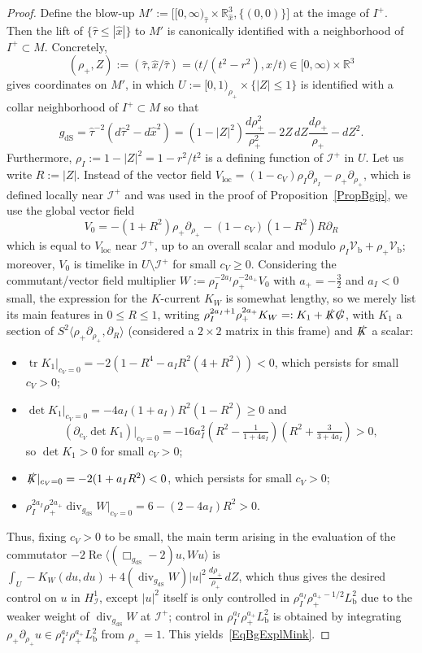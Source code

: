 \documentclass[reqno,11pt,letterpaper]{amsart}
\numberwithin{equation}{section}
\numberwithin{figure}{section}
\theoremstyle{definition}
\theoremstyle{remark}
\newcommand{\ms}{\mathscr}
\newcommand{\scri}{\ms I}
\newcommand{\R}{\mathbb{R}}
\newcommand{\slG}{\slashed{G}{}}
\newcommand{\slK}{\slashed{K}{}}
\renewcommand{\Re}{\operatorname{Re}}
\newcommand{\tr}{\operatorname{tr}}
\newcommand{\dv}{\operatorname{div}}
\newcommand{\dS}{{\mathrm{dS}}}
\newcommand{\la}{\langle}
\newcommand{\pa}{\partial}
\newcommand{\ra}{\rangle}
\newcommand{\bop}{{\mathrm{b}}}
\newcommand{\Vf}{\mathcal V}
\newcommand{\Vb}{\Vf_\bop}
\newcommand{\loc}{{\mathrm{loc}}}
\newcommand{\Hscri}{H_{\scri}}
\begin{document}
\begin{proof}
  Define the blow-up $M':=\bigl[[0,\infty)_{\hat\tau}\times\R^3_{\hat x},\{(0,0)\}\bigr]$ at the image of $I^+$. Then the lift of $\{\hat\tau\leq |\hat x|\}$ to $M'$ is canonically identified with a neighborhood of $I^+\subset M$. Concretely,
  \[
    (\rho_+,Z):=(\hat\tau,\hat x/\hat\tau)=\bigl(t/(t^2-r^2),x/t\bigr) \in [0,\infty)\times\R^3
  \]
  gives coordinates on $M'$, in which $U:=[0,1)_{\rho_+}\times\{|Z|\leq 1\}$ is identified with a collar neighborhood of $I^+\subset M$ so that
  \begin{equation}
  \label{EqBgExplStaticdS}
    g_\dS=\hat\tau^{-2}(d\hat\tau^2-d\hat x^2) = (1-|Z|^2)\frac{d\rho_+^2}{\rho_+^2} - 2 Z\,dZ\frac{d\rho_+}{\rho_+} - dZ^2.
  \end{equation}
  Furthermore, $\rho_I:=1-|Z|^2=1-r^2/t^2$ is a defining function of $\scri^+$ in $U$. Let us write $R:=|Z|$. Instead of the vector field $V_\loc=(1-c_V)\rho_I\pa_{\rho_I}-\rho_+\pa_{\rho_+}$, which is defined locally near $\scri^+$ and was used in the proof of Proposition~\ref{PropBgip}, we use the global vector field
  \[
    V_0 = -(1+R^2)\rho_+\pa_{\rho_+} - (1-c_V)(1-R^2)R\pa_R
  \]
  which is equal to $V_\loc$ near $\scri^+$, up to an overall scalar and modulo $\rho_I\Vb+\rho_+\Vb$; moreover, $V_0$ is timelike in $U\setminus\scri^+$ for small $c_V\geq 0$. Considering the commutant/vector field multiplier $W:=\rho_I^{-2 a_I}\rho_+^{-2 a_+}V_0$ with $a_+=-\tfrac32$ and $a_I<0$ small, the expression for the $K$-current $K_W$ is somewhat lengthy, so we merely list its main features in $0\leq R\leq 1$, writing $\rho_I^{2 a_I+1}\rho_+^{2 a_+}K_W=:K_1+\slK\slG$, with $K_1$ a section of $S^2\la \rho_+\pa_{\rho_+},\pa_R\ra$ (considered a $2\times 2$ matrix in this frame) and $\slK$ a scalar:
  \begin{itemize}
  \item $\tr K_1|_{c_V=0}=-2(1-R^4-a_I R^2(4+R^2))<0$, which persists for small $c_V>0$;
  \item $\det K_1|_{c_V=0}=-4 a_I(1+a_I)R^2(1-R^2)\geq 0$ and
    \[
      (\pa_{c_V}\det K_1)|_{c_V=0} = -16 a_I^2(R^2-\tfrac{1}{1+4 a_I})(R^2+\tfrac{3}{3+4 a_I}) > 0,
    \]
    so $\det K_1>0$ for small $c_V>0$;
  \item $\slK|_{c_V=0}=-2(1+a_I R^2)<0$, which persists for small $c_V>0$;
  \item $\rho_I^{2 a_I}\rho_+^{2 a_+}\dv_{g_\dS}W|_{c_V=0}=6-(2-4 a_I)R^2>0$.
  \end{itemize}
  Thus, fixing $c_V>0$ to be small, the main term arising in the evaluation of the commutator $-2\Re\la(\Box_{g_\dS}-2)u,W u\ra$ is $\int_U -K_W(d u,d u)+4(\dv_{g_\dS}W)|u|^2\,\frac{d\rho_+}{\rho_+}\,dZ$, which thus gives the desired control on $u$ in $\Hscri^1$, except $|u|^2$ itself is only controlled in $\rho_I^{a_I}\rho_+^{a_+-1/2}L^2_\bop$ due to the weaker weight of $\dv_{g_\dS}W$ at $\scri^+$; control in $\rho_I^{a_I}\rho_+^{a_+}L^2_\bop$ is obtained by integrating $\rho_+\pa_{\rho_+}u\in\rho_I^{a_I}\rho_+^{a_+}L^2_\bop$ from $\rho_+=1$. This yields~\eqref{EqBgExplMink}.
\end{proof}
\end{document}
